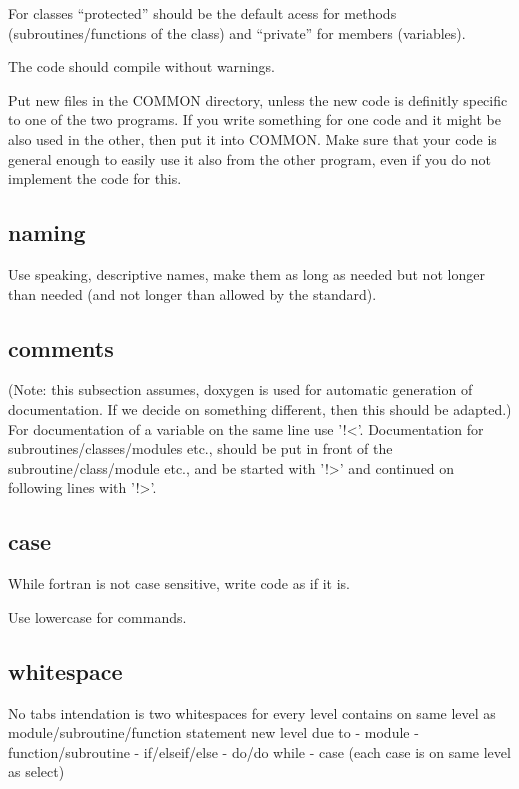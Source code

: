\documentclass{article}
\begin{document}
For classes ``protected'' should be the default acess for methods
(subroutines/functions of the class) and ``private'' for members
(variables).

The code should compile without warnings.

Put new files in the COMMON directory, unless the new code is definitly
specific to one of the two programs.
If you write something for one code and it might be also used in the
other, then put it into COMMON. Make sure that your code is general
enough to easily use it also from the other program, even if you do not
implement the code for this.

\subsection{naming}
Use speaking, descriptive names, make them as long as needed but not
longer than needed (and not longer than allowed by the standard).

\subsection{comments}
(Note: this subsection assumes, doxygen is used for automatic generation
of documentation. If we decide on something different, then this should
be adapted.)\\
For documentation of a variable on the same line use '!<'.
Documentation for subroutines/classes/modules etc., should be put in
front of the subroutine/class/module etc., and be started with '!>' and
continued on following lines with '!>'.

\subsection{case}
While fortran is not case sensitive, write code as if it is.

Use lowercase for commands.

\subsection{whitespace}
No tabs
intendation is two whitespaces for every level
contains on same level as module/subroutine/function statement
new level due to
- module
- function/subroutine
- if/elseif/else
- do/do while
- case (each case is on same level as select)
\end{document}
